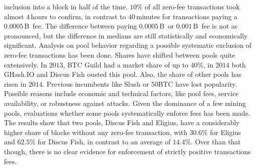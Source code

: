\documentclass[USenglish]{uit-thesis}
\def\bitcoin{\leavevmode\rlap{\hskip.5pt-}B}
\begin{document}
inclusion into a block in half of the time. $10\%$ of all zero-fee
transactions took almost $4$\,hours to confirm, in contrast
to $40$\,minutes for transactions paying
a $0.0005$\,\bitcoin~fee. The difference
between paying $0.0005$\,\bitcoin~or
$0.001$\,\bitcoin~fee is not as pronounced, but the difference
in medians are still statistically and economically significant.
Analysis on pool behavior regarding a possible systematic
exclusion of zero-fee transactions has been done.
Shares have shifted between pools quite extensively.
In $2013$, BTC Guild had a market share of up to $40\%$,
in $2014$ both GHash.IO and Discus Fish ousted this pool.
Also, the share of other pools has risen in $2014$. Previous
incumbents like Slush or $50$BTC have lost popularity.
Possible reasons include economic and technical factors,
like pool fees, service availability, or robustness against
attacks. Given the dominance of a few mining pools, evaluations
whether some pools systematically enforce fees has been made.
The results show that two pools, Discus Fish and Eligius,
have a considerably higher share of blocks without any
zero-fee transaction, with $30.6\%$ for Eligius and $62.5\%$
for Discus Fish, in contrast to an average of $14.4\%$.
Over than that though, there is no clear evidence for
enforcement of strictly positive transactions fees.
\end{document}
